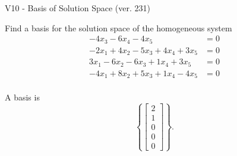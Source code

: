 \begin{exercise}
  \begin{exerciseTitle}V10 - Basis of Solution Space (ver. 231)\end{exerciseTitle}
  \begin{exerciseStatement}
    Find a basis for the solution space of the homogeneous system 
\begin{align*}
 -4 x_ 3 -6 x_ 4 -4 x_ 5 &= 0  \\ 
  -2 x_ 1 + 4 x_ 2 -5 x_ 3 + 4 x_ 4 + 3 x_ 5 &= 0  \\ 
  3 x_ 1 -6 x_ 2 -6 x_ 3 + 1 x_ 4 + 3 x_ 5 &= 0  \\ 
  -4 x_ 1 + 8 x_ 2 + 5 x_ 3 + 1 x_ 4 -4 x_ 5 &= 0  \\ 
 \end{align*}


 
  \end{exerciseStatement}

  \begin{exerciseAnswer}
   A basis is   
\[\left\{\left[\begin{array}{c}
2 \\
1 \\
0 \\
0 \\
0
\end{array}\right]\right\}.\]

  


  \end{exerciseAnswer}
\end{exercise}